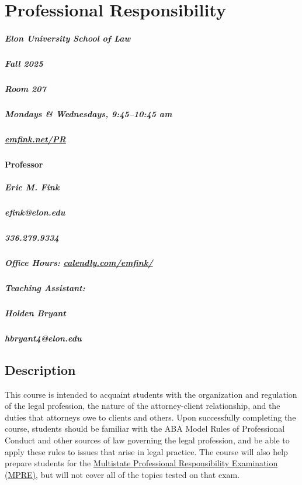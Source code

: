 \documentclass[11pt,letterpaper,twoside]{article}
\begin{document}
\thispagestyle{empty}

\color{OffBlack}


\section{Professional Responsibility}

\begin{footnotesize}
\subparagraph{Elon University School of Law}
\subparagraph{Fall 2025}
\subparagraph{Room 207}
\subparagraph{Mondays \& Wednesdays, 9:45--10:45 am}
\subparagraph{\url{emfink.net/PR}}
\vspace{1em}

\paragraph{Professor}
\subparagraph{Eric M. Fink} 
\subparagraph{efink@elon.edu}
\subparagraph{336.279.9334} 
\subparagraph{Office Hours: {\url{calendly.com/emfink/}}}

\vspace{1em}

\subparagraph{Teaching Assistant:}
\subparagraph{Holden Bryant}
\subparagraph{hbryant4@elon.edu}
\end{footnotesize}

\vspace{1em}


\subsection{Description}\label{description}

This course is intended to acquaint students with the organization and
regulation of the legal profession, the nature of the attorney-client
relationship, and the duties that attorneys owe to clients and others.
Upon successfully completing the course, students should be familiar
with the ABA Model Rules of Professional Conduct and other sources of
law governing the legal profession, and be able to apply these rules to
issues that arise in legal practice. The course will also help prepare
students for the \href{https://www.ncbex.org/exams/mpre/}{Multistate
Professional Responsibility Examination (MPRE)}, but will not cover all
of the topics tested on that exam.
\end{document}
